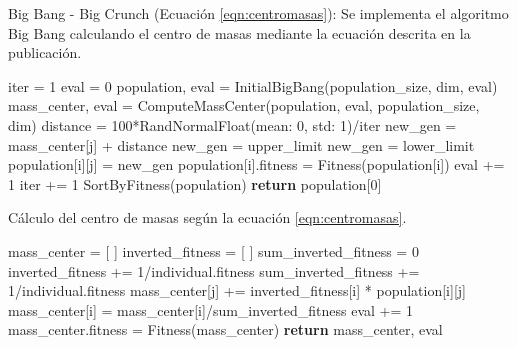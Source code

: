 \begin{algorithm}[H]
\caption{Big Bang - Big Crunch (Ecuación \ref{eqn:centromasas}): Se implementa el algoritmo Big Bang calculando el centro de masas mediante la ecuación descrita en la publicación.}
\begin{algorithmic}[1]
  \State iter = 1
  \State eval = 0
  \State population, eval = InitialBigBang(population\_size, dim, eval)
  \State
    \State mass\_center, eval = ComputeMassCenter(population, eval, population\_size, dim)
    \State
        \State distance = 100*RandNormalFloat(mean: 0, std: 1)/iter
        \State new\_gen = mass\_center[j] + distance
        \State
          \State new\_gen = upper\_limit
        \EndIf
          \State new\_gen = lower\_limit
        \EndIf
        \State
        \State population[i][j] = new\_gen
      \EndFor
      \State population[i].fitness = Fitness(population[i])
      \State eval += 1
    \EndFor
    \State iter += 1 
  \EndWhile
  \State
  \State SortByFitness(population)
  \State \textbf{return} population[0]
\EndProcedure
\end{algorithmic}
\end{algorithm}

\begin{algorithm}[H]
\caption{Cálculo del centro de masas según la ecuación \ref{eqn:centromasas}.}
\begin{algorithmic}[1]
  \State mass\_center = [ ] 
  \State inverted\_fitness = [ ]
  \State sum\_inverted\_fitness = 0
  \State 
    \State inverted\_fitness += {1/individual.fitness}
    \State sum\_inverted\_fitness += 1/individual.fitness
  \EndFor
  \State
      \State mass\_center[j] += inverted\_fitness[i] * population[i][j]
    \EndFor
  \EndFor
  \State
    \State mass\_center[i] = mass\_center[i]/sum\_inverted\_fitness
  \EndFor
  \State
  \State eval += 1
  \State mass\_center.fitness = Fitness(mass\_center)
  \State \textbf{return} mass\_center, eval
\EndProcedure
\end{algorithmic}
\end{algorithm}

